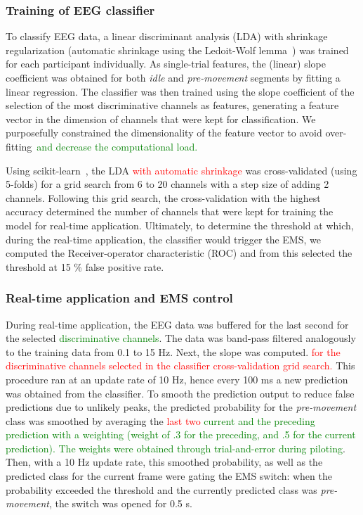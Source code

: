 \subsubsection{Training of EEG classifier}
To classify EEG data, a linear discriminant analysis (LDA) with shrinkage regularization (automatic shrinkage using the Ledoit-Wolf lemma~\cite{Ledoit2004-bi}) was trained for each participant individually. As single-trial features, the (linear) slope coefficient was obtained for both \textit{idle} and \textit{pre-movement} segments by fitting a linear regression. The classifier was then trained using the slope coefficient of the selection of the most discriminative channels as features, generating a feature vector in the dimension of channels that were kept for classification. We purposefully constrained the dimensionality of the feature vector to avoid over-fitting~\textcolor{green}{and decrease the computational load.}

Using scikit-learn~\cite{Pedregosa2012-sj}, the LDA \textcolor{red}{with automatic shrinkage} was cross-validated (using 5-folds) for a grid search from 6 to 20 channels with a step size of adding 2 channels. Following this grid search, the cross-validation with the highest accuracy determined the number of channels that were kept for training the model for real-time application. Ultimately, to determine the threshold at which, during the real-time application, the classifier would trigger the EMS, we computed the Receiver-operator characteristic (ROC) and from this selected the threshold at 15 \% false positive rate.

\subsubsection{Real-time application and EMS control}
During real-time application, the EEG data was buffered for the last second for the selected \textcolor{green}{discriminative channels}. The data was band-pass filtered analogously to the training data from 0.1 to 15 Hz. Next, the slope was computed. \textcolor{red}{for the discriminative channels selected in the classifier cross-validation grid search.} This procedure ran at an update rate of 10 Hz, hence every 100 ms a new prediction was obtained from the classifier. To smooth the prediction output to reduce false predictions due to unlikely peaks, the predicted probability for the \textit{pre-movement} class was smoothed by averaging the \textcolor{red}{last two} \textcolor{green}{current and the preceding prediction with a weighting (weight of .3 for the preceding, and .5 for the current prediction). The weights were obtained through trial-and-error during piloting}. Then, with a 10 Hz update rate, this smoothed probability, as well as the predicted class for the current frame were gating the EMS switch: when the probability exceeded the threshold and the currently predicted class was \textit{pre-movement}, the switch was opened for 0.5 s.

